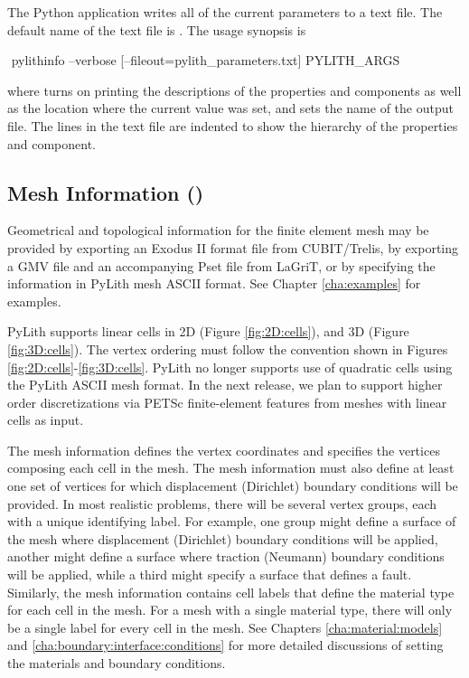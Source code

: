 The Python application  writes all of the current
parameters to a text file. The default name of the text file is .
The usage synopsis is
\begin{shell}
$$ pylithinfo --verbose [--fileout=pylith_parameters.txt] PYLITH_ARGS
\end{shell}
where  turns on printing the descriptions of
the properties and components as well as the location where the
current value was set, and
 sets the name of the
output file. The lines in the text file are indented to show the
hierarchy of the properties and component.


\subsection{Mesh Information ()}

Geometrical and topological information for the finite element mesh
may be provided by exporting an Exodus II format file from
CUBIT/Trelis, by exporting a GMV file and an accompanying Pset file
from LaGriT, or by specifying the information in PyLith mesh ASCII
format. See Chapter \vref{cha:examples} for examples.

PyLith supports linear cells in 2D (Figure \vref{fig:2D:cells}), and
3D (Figure \vref{fig:3D:cells}).  The vertex ordering must follow the
convention shown in Figures \vref{fig:2D:cells}-\vref{fig:3D:cells}.
PyLith no longer supports use of quadratic cells using the PyLith
ASCII mesh format. In the next release, we plan to support higher
order discretizations via PETSc finite-element features from meshes
with linear cells as input.

The mesh information defines the vertex coordinates and specifies
the vertices composing each cell in the mesh. The mesh information
must also define at least one set of vertices for which displacement
(Dirichlet) boundary conditions will be provided. In most realistic
problems, there will be several vertex groups, each with a unique
identifying label. For example, one group might define a surface of
the mesh where displacement (Dirichlet) boundary conditions will be
applied, another might define a surface where traction (Neumann) boundary
conditions will be applied, while a third might specify a surface
that defines a fault. Similarly, the mesh information contains cell
labels that define the material type for each cell in the mesh. For
a mesh with a single material type, there will only be a single label
for every cell in the mesh. See Chapters \vref{cha:material:models}
and \vref{cha:boundary:interface:conditions} for more detailed discussions
of setting the materials and boundary conditions.

